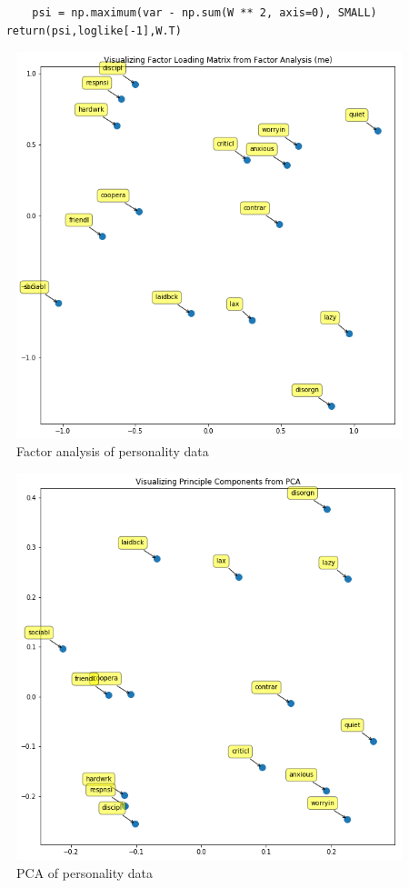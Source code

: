 \documentclass{article}
\begin{document}
\begin{enumerate}
\begin{verbatim}
        psi = np.maximum(var - np.sum(W ** 2, axis=0), SMALL)
    return(psi,loglike[-1],W.T)
\end{verbatim}
\begin{figure}[ht]
\includegraphics[width=\textwidth]{../plots/p4.png}
\caption{Factor analysis of personality data}
\label{fig_p4_factor}
\end{figure}

\begin{figure}[ht]
\includegraphics[width=\textwidth]{../plots/p4_pca.png}
\caption{PCA of personality data}
\label{fig_p4_pca}
\end{figure}

\end{enumerate}
\end{document}
